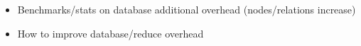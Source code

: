 \todo{}
\begin{itemize}
	\item Benchmarks/stats on database
		\subitem additional overhead (nodes/relations increase)
	\item How to improve database/reduce overhead
\end{itemize}
